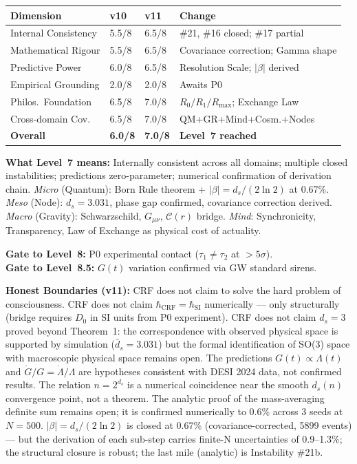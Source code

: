 \documentclass[12pt, a4paper]{article}
\begin{document}
\begin{center}
{\small
\begin{tabular}{p{4.0cm} p{1.6cm} p{1.6cm} p{5.2cm}}
\toprule
\textbf{Dimension} & \textbf{v10} & \textbf{v11} & \textbf{Change} \\
\midrule
Internal Consistency & 5.5/8 & 6.5/8 & \#21, \#16 closed; \#17 partial \\
Mathematical Rigour & 5.5/8 & 6.5/8 & Covariance correction; Gamma shape \\
Predictive Power & 6.0/8 & 6.5/8 & Resolution Scale; $|\beta|$ derived \\
Empirical Grounding & 2.0/8 & 2.0/8 & Awaits P0 \\
Philos.\ Foundation & 6.5/8 & 7.0/8 & $R_0/R_1/R_{\max}$; Exchange Law \\
Cross-domain Cov. & 6.5/8 & 7.0/8 & QM+GR+Mind+Cosm.+Nodes \\
\midrule
\textbf{Overall} & \textbf{6.0/8} & \textbf{7.0/8} & \textbf{Level~7 reached} \\
\bottomrule
\end{tabular}
}
\end{center}

\textbf{What Level~7 means:} Internally consistent across all domains; multiple closed
instabilities; predictions zero-parameter; numerical confirmation of derivation chain.
\textit{Micro} (Quantum): Born Rule theorem + $|\beta| = d_s/(2\ln 2)$ at 0.67\%.
\textit{Meso} (Node): $d_s = 3.031$, phase gap confirmed, covariance correction derived.
\textit{Macro} (Gravity): Schwarzschild, $G_{\mu\nu}$, $\mathcal{C}(r)$ bridge.
\textit{Mind}: Synchronicity, Transparency, Law of Exchange as physical cost of actuality.

\textbf{Gate to Level~8:} P0 experimental contact ($\tau_1 \neq \tau_2$ at $> 5\sigma$).\\
\textbf{Gate to Level~8.5:} $G(t)$ variation confirmed via GW standard sirens.

\textbf{Honest Boundaries (v11):}
CRF does not claim to solve the hard problem of consciousness.
CRF does not claim $\hbar_{\mathrm{CRF}} = \hbar_{\mathrm{SI}}$ numerically --- only
structurally (bridge requires $D_0$ in SI units from P0 experiment).
CRF does not claim $d_s = 3$ proved beyond Theorem~1: the correspondence with observed
physical space is supported by simulation ($\bar{d}_s = 3.031$) but the formal identification
of SO(3) space with macroscopic physical space remains open.
The predictions $G(t) \propto \Lambda(t)$ and $\dot{G}/G = \dot{\Lambda}/\Lambda$ are
hypotheses consistent with DESI 2024 data, not confirmed results.
The relation $n = 2^{d_s}$ is a numerical coincidence near the smooth $d_s(n)$ convergence
point, not a theorem.
The analytic proof of the mass-averaging definite sum remains open; it is confirmed
numerically to 0.6\% across 3 seeds at $N = 500$.
$|\beta| = d_s/(2\ln 2)$ is closed at 0.67\% (covariance-corrected, 5899 events) ---
but the derivation of each sub-step carries finite-N uncertainties of 0.9--1.3\%; the
structural closure is robust; the last mile (analytic) is Instability \#21b.
\end{document}
